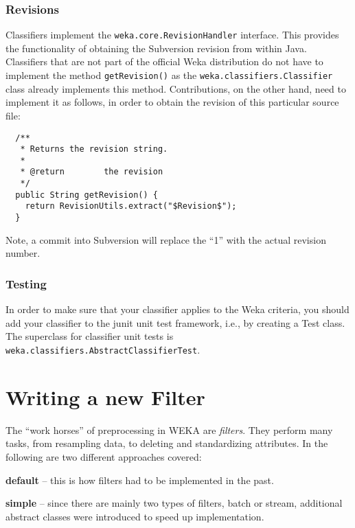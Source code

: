 \subsubsection*{Revisions}
\label{classifier_revisions}
Classifiers implement the \texttt{weka.core.RevisionHandler} interface. This
provides the functionality of obtaining the Subversion revision from within
Java. Classifiers that are not part of the official Weka distribution
do not have to implement the method \texttt{getRevision()} as the
\texttt{weka.classifiers.Classifier} class already implements this method.
Contributions, on the other hand, need to implement it as follows, in order to
obtain the revision of this particular source file:
\begin{verbatim}
  /**
   * Returns the revision string.
   *
   * @return        the revision
   */
  public String getRevision() {
    return RevisionUtils.extract("$Revision$");
  }
\end{verbatim}
Note, a commit into Subversion will replace the ``1'' with the actual revision
number.

\subsubsection*{Testing}
In order to make sure that your classifier applies to the Weka criteria, you
should add your classifier to the junit unit test framework, i.e., by creating a
Test class. The superclass for classifier unit tests is
\texttt{weka.classifiers.AbstractClassifierTest}.


\newpage
\section{Writing a new Filter}
The ``work horses'' of preprocessing in WEKA are \textit{filters}. They perform
many tasks, from resampling data, to deleting and standardizing attributes. In
the following are two different approaches covered:
\begin{tight_itemize}
  \item \textbf{default} -- this is how filters had to be implemented in the
past.
  \item \textbf{simple }-- since there are mainly two types of filters, batch or
stream, additional abstract classes were introduced to speed up implementation.
\end{tight_itemize}

